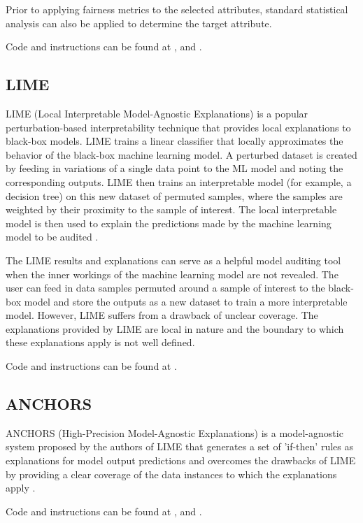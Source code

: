 \documentclass[conference]{IEEEtran}
\begin{document}
Prior to applying fairness metrics to the selected attributes, standard statistical analysis can also be applied to determine the target attribute.

Code and instructions can be found at \cite{b17}, \cite{b18} and \cite{b19}.

\subsection{LIME}

LIME (Local Interpretable Model-Agnostic Explanations) \cite{b20} is a popular perturbation-based interpretability technique that provides local explanations to black-box models. LIME trains a linear classifier that locally approximates the behavior of the black-box machine learning model. A perturbed dataset is created by feeding in variations of a single data point to the ML model and noting the corresponding outputs. LIME then trains an interpretable model (for example, a decision tree) on this new dataset of permuted samples, where the samples are weighted by their proximity to the sample of interest. The local interpretable model is then used to explain the predictions made by the machine learning model to be audited \cite{b21}.

The LIME results and explanations can serve as a helpful model auditing tool when the inner workings of the machine learning model are not revealed. The user can feed in data samples permuted around a sample of interest to the black-box model and store the outputs as a new dataset to train a more interpretable model. 
However, LIME suffers from a drawback of unclear coverage. The explanations provided by LIME are local in nature and the boundary to which these explanations apply is not well defined.

Code and instructions can be found at \cite{b22}.

\subsection{ANCHORS}

ANCHORS (High-Precision Model-Agnostic Explanations) is a model-agnostic system proposed by the authors of LIME that generates a set of 'if-then' rules as explanations for model output predictions and overcomes the drawbacks of LIME by providing a clear coverage of the data instances to which the explanations apply \cite{b23}.

Code and instructions can be found at \cite{b24}, \cite{b25} and \cite{b26}.
\end{document}
